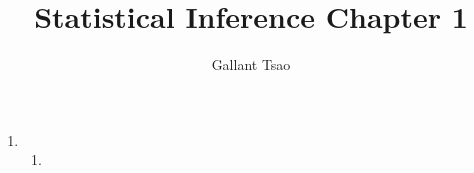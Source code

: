 \documentclass{article}
\title{Statistical Inference Chapter 1}
\author{Gallant Tsao}
\begin{document}
\maketitle

\begin{enumerate}
    \item \begin{enumerate}
        \item 
    \end{enumerate}
\end{enumerate}
\end{document}
